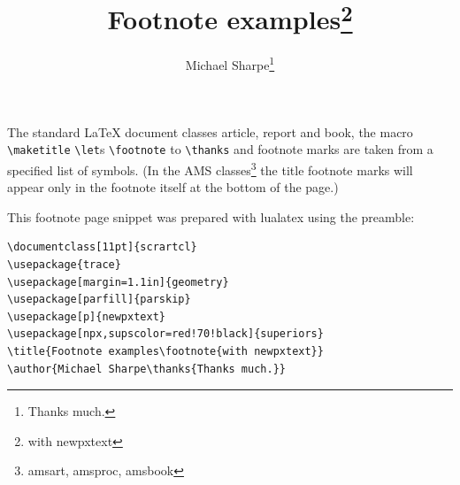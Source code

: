 \if1\zz\documentclass[11pt]{article}
\title{Footnote examples\footnote{with newpxtext}}
\author{Michael Sharpe\thanks{Thanks much.}}
\def\tt{\normalfont\ttfamily}
\begin{document}
\maketitle
\thispagestyle{empty}
%



The standard LaTeX document classes {\tt article}, {\tt report} and {\tt book}, the macro \verb|\maketitle| \verb|\let|s \verb|\footnote| to \verb|\thanks| and footnote marks are taken from a specified list of symbols. (In the AMS classes\footnote{amsart, amsproc, amsbook} the title footnote marks will appear only in the footnote itself at the bottom of the page.)\\

\centerline{
}
This footnote page snippet was prepared with {\tt lualatex} using the preamble:
\begin{verbatim}
\documentclass[11pt]{scrartcl}  
\usepackage{trace}
\usepackage[margin=1.1in]{geometry}
\usepackage[parfill]{parskip}
\usepackage[p]{newpxtext} 
\usepackage[npx,supscolor=red!70!black]{superiors}
\title{Footnote examples\footnote{with newpxtext}}
\author{Michael Sharpe\thanks{Thanks much.}}
\end{verbatim}


 
\end{document}
